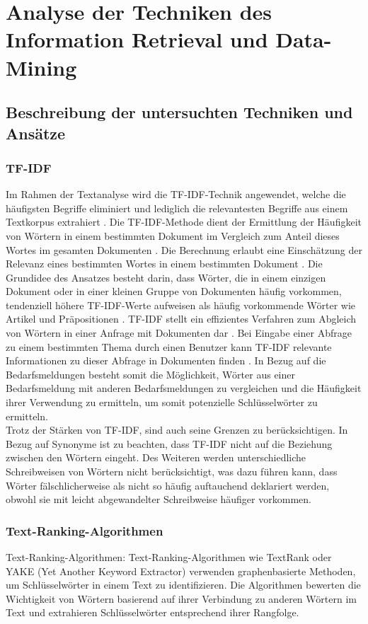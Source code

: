 \chapter{Analyse der Techniken des Information Retrieval und Data-Mining}
\label{chap:staffingadvisor}
\section{Beschreibung der untersuchten Techniken und Ansätze}

\subsection{TF-IDF}
Im Rahmen der Textanalyse wird die TF-IDF-Technik angewendet, welche die häufigsten Begriffe eliminiert und lediglich die relevantesten Begriffe aus einem Textkorpus extrahiert \cite{bafna2016document}. Die TF-IDF-Methode dient der Ermittlung der Häufigkeit von Wörtern in einem bestimmten Dokument im Vergleich zum Anteil dieses Wortes im gesamten Dokumenten \cite{ramos2003using}. Die Berechnung erlaubt eine Einschätzung der Relevanz eines bestimmten Wortes in einem bestimmten Dokument \cite{ramos2003using}. Die Grundidee des Ansatzes besteht darin, dass Wörter, die in einem einzigen Dokument oder in einer kleinen Gruppe von Dokumenten häufig vorkommen, tendenziell höhere TF-IDF-Werte aufweisen als häufig vorkommende Wörter wie Artikel und Präpositionen \cite{ramos2003using}. TF-IDF stellt ein effizientes Verfahren zum Abgleich von Wörtern in einer Anfrage mit Dokumenten dar \cite{ramos2003using}. Bei Eingabe einer Abfrage zu einem bestimmten Thema durch einen Benutzer kann TF-IDF relevante Informationen zu dieser Abfrage in Dokumenten finden \cite{ramos2003using}. In Bezug auf die Bedarfsmeldungen besteht somit die Möglichkeit, Wörter aus einer Bedarfsmeldung mit anderen Bedarfsmeldungen zu vergleichen und die Häufigkeit ihrer Verwendung zu ermitteln, um somit potenzielle Schlüsselwörter zu ermitteln.\\

Trotz der Stärken von TF-IDF, sind auch seine Grenzen zu berücksichtigen. In Bezug auf Synonyme ist zu beachten, dass TF-IDF nicht auf die Beziehung zwischen den Wörtern eingeht. Des Weiteren werden unterschiedliche Schreibweisen von Wörtern nicht berücksichtigt, was dazu führen kann, dass Wörter fälschlicherweise als nicht so häufig auftauchend deklariert werden, obwohl sie mit leicht abgewandelter Schreibweise häufiger vorkommen.
\subsection{Text-Ranking-Algorithmen}
Text-Ranking-Algorithmen: Text-Ranking-Algorithmen wie TextRank oder YAKE (Yet Another Keyword Extractor) verwenden graphenbasierte Methoden, um Schlüsselwörter in einem Text zu identifizieren. Die Algorithmen bewerten die Wichtigkeit von Wörtern basierend auf ihrer Verbindung zu anderen Wörtern im Text und extrahieren Schlüsselwörter entsprechend ihrer Rangfolge.\\ \cite{mihalcea2004textrank}\cite{zhang2020empirical}\cite{pay2019ensemble}\\

